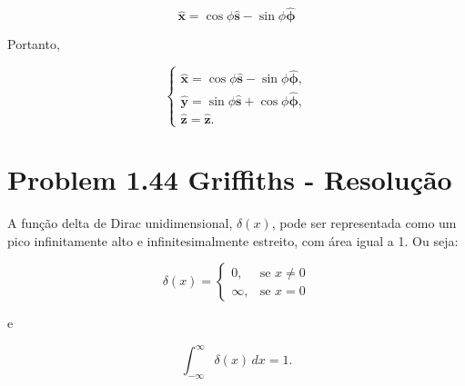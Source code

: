 \documentclass[a4paper,12pt]{article}
\newcommand{\printingbibliography}{%

    \pagestyle{myheadings}
    \markright{}
    \sloppy
    \printbibliography[heading=bibintoc, %
                   title=Refer\^encias %
                  ]
    \fussy%
}
\begin{document}
\begin{equation}
    \hat{\mathbf{x}} = \cos\phi \hat{\mathbf{s}} - \sin\phi \hat{\bm{\phi}}
\end{equation}

Portanto,

\begin{equation}
    \begin{cases}
        \hat{\mathbf{x}} = \cos\phi \hat{\mathbf{s}} - \sin\phi \hat{\bm{\phi}}, \\
        \hat{\mathbf{y}} = \sin\phi \hat{\mathbf{s}} + \cos\phi \hat{\bm{\phi}}, \\
        \hat{\bm{z}} = \hat{\bm{z}}.
    \end{cases}
    \end{equation}

\section*{Problem 1.44 Griffiths - Resolu\c{c}\~ao}

A função delta de Dirac unidimensional, \(\delta(x)\), pode ser representada como um pico infinitamente alto e 
infinitesimalmente estreito, com área igual a 1. Ou seja:

\begin{equation}
\delta(x) =
\begin{cases}
    0, & \text{se } x \neq 0 \\
    \infty, & \text{se } x = 0
\end{cases}
\end{equation}

e

\begin{equation}
\int_{-\infty}^{\infty} \delta(x) \, dx = 1.
\end{equation}


\end{document}

